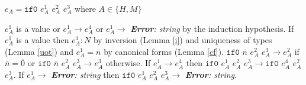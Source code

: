 \begin{case}

$e_{A}=\mathtt{if0}$ $e_{A}^{1}$ $e_{A}^{2}$ $e_{A}^{3}$ where $A\in\lbrace H,M\rbrace$

$e_{A}^{1}$ is a value or $e_{A}^{1}\rightarrow e_{A}^{4}$ or $e_{A}^{1}\rightarrow$ \emph{\textbf{Error}: string} by the induction hypothesis.  If $e_{A}^{1}$ is a value then $e_{A}^{1}:N$ by inversion (Lemma \ref{i}) and uniqueness of types (Lemma \ref{uot}) and $e_{A}^{1}=\overline{n}$ by canonical forms (Lemma \ref{cf}).  $\mathtt{if0}$ $\overline{n}$ $e_{A}^{2}$ $e_{A}^{3}\rightarrow e_{A}^{2}$ if $\overline{n}=\overline{0}$ or $\mathtt{if0}$ $\overline{n}$ $e_{A}^{2}$ $e_{A}^{3}\rightarrow e_{A}^{3}$ otherwise.  If $e_{A}^{1}\rightarrow e_{A}^{4}$ then $\mathtt{if0}$ $e_{A}^{1}$ $e_{A}^{2}$ $e_{A}^{3}\rightarrow \mathtt{if0}$ $e_{A}^{4}$ $e_{A}^{2}$ $e_{A}^{3}$.  If $e_{A}^{1}\rightarrow$ \emph{\textbf{Error}: string} then $\mathtt{if0}$ $e_{A}^{1}$ $e_{A}^{2}$ $e_{A}^{3}\rightarrow$ \emph{\textbf{Error}: string}.

\end{case}